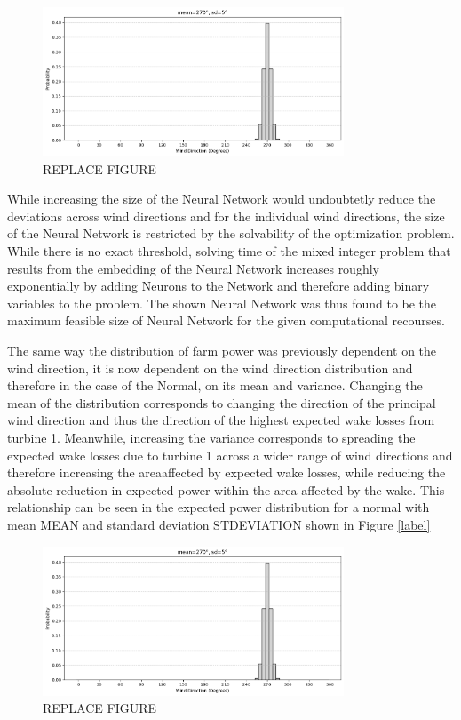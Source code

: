\begin{figure}[h] 
	\centering
	\includegraphics[width=0.8\textwidth]{figures/optimization/wind_dist_opti.png} 
	\caption{REPLACE FIGURE }
	\label{fig:wind_dist_opti}
\end{figure}



While increasing the size of the Neural Network would undoubtetly reduce the deviations across wind directions and for the individual wind directions, the size of the Neural Network is restricted by the solvability of the optimization problem. While there is no exact threshold, solving time of the mixed integer problem that results from the embedding of the Neural Network increases roughly exponentially by adding Neurons to the Network and therefore adding binary variables to the problem. The shown Neural Network was thus found to be the maximum feasible size of Neural Network for the given computational recourses. 


The same way the distribution of farm power was previously dependent on the wind direction, it is now dependent on the wind direction distribution and therefore in the case of the Normal, on its mean and variance. Changing the mean of the distribution corresponds to changing the direction of the principal wind direction and thus the direction of the highest expected wake losses from turbine 1. Meanwhile, increasing the variance corresponds to spreading the expected wake losses due to turbine 1 across a wider range of wind directions and therefore increasing the areaaffected by expected wake losses, while reducing the absolute reduction in expected power within the area affected by the wake. This relationship can be seen in the expected power distribution for a normal with mean MEAN and standard deviation STDEVIATION shown in Figure \ref{label}


\begin{figure}[h] 
	\centering
	\includegraphics[width=0.8\textwidth]{figures/optimization/wind_dist_opti.png} 
	\caption{REPLACE FIGURE }
	\label{fig:wind_dist_opti}
\end{figure}


